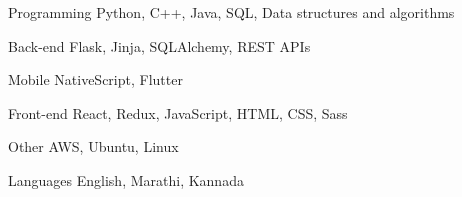 

\begin{cvskills}

  \cvskill
    {Programming} %
    {Python, C++, Java, SQL, Data structures and algorithms} %

  \cvskill
    {Back-end} %
    {Flask, Jinja, SQLAlchemy, REST APIs} %
    
  \cvskill
    {Mobile} %
    {NativeScript, Flutter} %

  \cvskill
    {Front-end} %
    {React, Redux, JavaScript, HTML, CSS, Sass} %
    
  \cvskill
    {Other} %
    {AWS, Ubuntu, Linux} %
    


  \cvskill
    {Languages} %
    {English, Marathi, Kannada} %

\end{cvskills}

